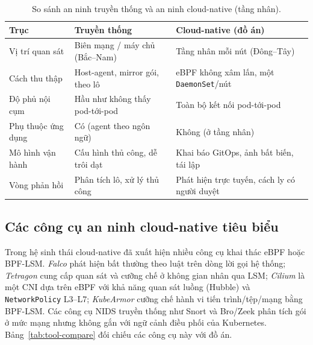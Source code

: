 \begin{table}[H]
  \centering
  \caption{So sánh an ninh truyền thống và an ninh cloud-native (tầng nhân).}
  \label{tab:trad-vs-cloud}
  \small
  \begin{tabularx}{\linewidth}{@{}l X X@{}}
    \toprule
    \textbf{Trục} & \textbf{Truyền thống} & \textbf{Cloud-native (đồ án)} \\
    \midrule
    Vị trí quan sát   & Biên mạng / máy chủ (Bắc--Nam)        & Tầng nhân mỗi nút (Đông--Tây) \\
    Cách thu thập     & Host-agent, mirror gói, theo lô       & eBPF không xâm lấn, một \texttt{DaemonSet}/nút \\
    Độ phủ nội cụm    & Hầu như không thấy pod-tới-pod        & Toàn bộ kết nối pod-tới-pod \\
    Phụ thuộc ứng dụng& Có (agent theo ngôn ngữ)              & Không (ở tầng nhân) \\
    Mô hình vận hành  & Cấu hình thủ công, dễ trôi dạt        & Khai báo GitOps, ảnh bất biến, tái lập \\
    Vòng phản hồi     & Phân tích lô, xử lý thủ công          & Phát hiện trực tuyến, cách ly có người duyệt \\
    \bottomrule
  \end{tabularx}
\end{table}

\subsection{Các công cụ an ninh cloud-native tiêu biểu}

Trong hệ sinh thái cloud-native đã xuất hiện nhiều công cụ khai thác eBPF hoặc BPF-LSM.
\emph{Falco} \cite{falco2024} phát hiện bất thường theo luật trên dòng lời gọi hệ thống;
\emph{Tetragon} \cite{tetragon2024} cung cấp quan sát và cưỡng chế ở không gian nhân qua
LSM; \emph{Cilium} \cite{cilium2024} là một CNI dựa trên eBPF với khả năng quan sát luồng
(Hubble) và \texttt{NetworkPolicy} L3--L7; \emph{KubeArmor} \cite{kubearmor2024} cưỡng chế
hành vi tiến trình/tệp/mạng bằng BPF-LSM. Các công cụ NIDS truyền thống như Snort
\cite{roesch1999snort} và Bro/Zeek \cite{paxson1999bro} phân tích gói ở mức mạng nhưng
không gắn với ngữ cảnh điều phối của Kubernetes. Bảng~\ref{tab:tool-compare} đối chiếu các
công cụ này với đồ án.


